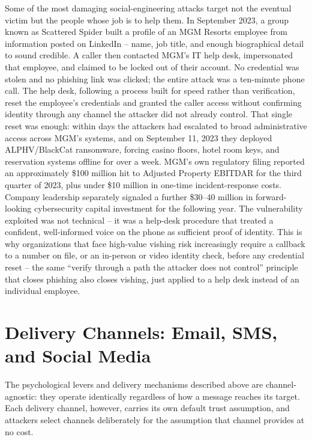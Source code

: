 \begin{example}
Some of the most damaging social-engineering attacks target not the eventual victim but the
people whose job is to help them. In September 2023, a group known as Scattered Spider built a
profile of an MGM Resorts employee from information posted on LinkedIn -- name, job title, and
enough biographical detail to sound credible. A caller then contacted MGM's IT help desk,
impersonated that employee, and claimed to be locked out of their account. No credential was
stolen and no phishing link was clicked; the entire attack was a ten-minute phone call. The help
desk, following a process built for speed rather than verification, reset the employee's
credentials and granted the caller access without confirming identity through any channel the
attacker did not already control. That single reset was enough: within days the attackers had
escalated to broad administrative access across MGM's systems, and on September 11, 2023 they
deployed ALPHV/BlackCat ransomware, forcing casino floors, hotel room keys, and reservation
systems offline for over a week. MGM's own regulatory filing reported an approximately \$100
million hit to Adjusted Property EBITDAR for the third quarter of 2023, plus under \$10 million in
one-time incident-response costs. Company leadership separately signaled a further \$30--40 million
in forward-looking cybersecurity capital investment for the following year. The
vulnerability exploited was not technical -- it was a help-desk
procedure that treated a confident, well-informed voice on the phone as sufficient proof of
identity. This is why organizations that face high-value vishing risk increasingly require a
callback to a number on file, or an in-person or video identity check, before any credential
reset -- the same ``verify through a path the attacker does not control'' principle that closes
phishing also closes vishing, just applied to a help desk instead of an individual employee.
\end{example}

\section{Delivery Channels: Email, SMS, and Social Media}

The psychological levers and delivery mechanisms described above are channel-agnostic: they operate
identically regardless of how a message reaches its target. Each delivery channel, however, carries
its own default trust assumption, and attackers select channels deliberately for the assumption
that channel provides at no cost.

